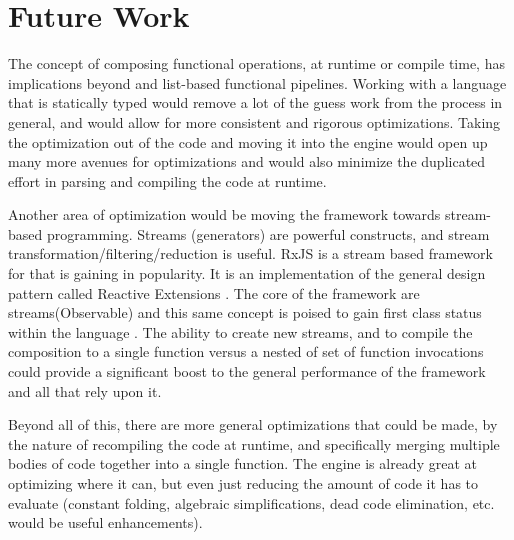 \section{Future Work}

The concept of composing functional operations, at runtime or compile time, has implications beyond \javascript and list-based functional pipelines. Working with a language that is statically typed would remove a lot of the guess work from the process in general, and would allow for more consistent and rigorous optimizations.  Taking the optimization out of the \javascript code and moving it into the engine would open up many more avenues for optimizations and would also minimize the duplicated effort in parsing and compiling the \javascript code at runtime.

Another area of optimization would be moving the framework towards stream-based programming.  Streams (generators) are powerful constructs, and stream transformation/filtering/reduction is useful.  RxJS \cite{rxjs16} is a stream based framework for \javascript that is gaining in popularity. It is an implementation of the general design pattern called Reactive Extensions \cite{rxio16}. The core of the framework are streams(Observable) and this same concept is poised to gain first class status within the \javascript language \cite{observablejs16}. The ability to create new streams, and to compile the composition to a single function versus a nested of set of function invocations could provide a significant boost to the general performance of the framework and all that rely upon it. 

Beyond all of this, there are more general optimizations that could be made, by the nature of recompiling the code at runtime, and specifically merging multiple bodies of code together into a single function.  The \veight \javascript engine is already great at optimizing where it can, but even just reducing the amount of code it has to evaluate (constant folding, algebraic simplifications, dead code elimination, etc. would be useful enhancements).